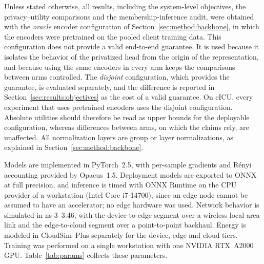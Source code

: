 Unless stated otherwise, all results, including the system-level objectives,
the privacy--utility comparisons and the membership-inference audit, were
obtained with the \emph{oracle} encoder configuration of
Section~\ref{sec:method:backbone}, in which the encoders were pretrained on the
pooled client training data. This configuration does not provide a valid
end-to-end guarantee. It is used because it isolates the behavior of the
privatized head from the origin of the representation, and because using the
same encoders in every arm keeps the comparisons between arms controlled. The
\emph{disjoint} configuration, which provides the guarantee, is evaluated
separately, and the difference is reported in
Section~\ref{sec:results:objectives} as the cost of a valid guarantee. On eICU,
every experiment that uses pretrained encoders uses the disjoint
configuration.
Absolute utilities should therefore be read as upper bounds for the deployable
configuration, whereas differences between arms, on which the claims rely, are
unaffected. All normalization layers are group or layer normalizations, as
explained in Section~\ref{sec:method:backbone}.

Models are implemented in PyTorch~2.5, with per-sample gradients and R\'enyi
accounting provided by Opacus~1.5. Deployment models are exported to ONNX at
full precision, and inference is timed with ONNX Runtime on the CPU
provider of a workstation (Intel Core i7-14700), since an edge node cannot be
assumed to have an accelerator; no edge hardware was used. Network behavior is simulated in ns-3~3.46,
with the device-to-edge segment over a wireless local-area link and the
edge-to-cloud segment over a point-to-point backhaul. Energy is modeled in
CloudSim~Plus separately for the device, edge and cloud tiers. Training was
performed on a single workstation with one NVIDIA RTX~A2000 GPU.
Table~\ref{tab:params} collects these parameters.

